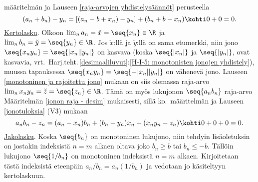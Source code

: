 määritelmän ja Lauseen \ref{raja-arvojen yhdistelysäännöt} perusteella
\[
(a_n+b_n)-y_n = [(a_n-b+x_n)-y_n]+(b_n+b-x_n) \kohti 0+0 = 0.
\]
\underline{Kertolasku}. Olkoon $\lim_na_n=\breve{x}=\seq{x_n}\in\R$ ja
$\lim_nb_n=\breve{y}=\seq{y_n}\in\R$. Jos $\breve{x}$:llä ja $\breve{y}$:llä on sama etumerkki,
niin jono $\seq{x_ny_n}=\seq{|x_n||y_n|}$ on kasvava (koska $\seq{|x_n|}$ ja $\seq{|y_n|}$, ovat
kasvavia, vrt.\ Harj.teht.\,\ref{desimaaliluvut}:\ref{H-I-5: monotonisten jonojen yhdistely}),
muussa tapauksessa $\seq{x_ny_n}=\seq{-|x_n||y_n|}$ on vähenevä jono. Lauseen
\ref{monotoninen ja rajoitettu jono} mukaan on siis olemassa raja-arvo
$\lim_nx_ny_n=\breve{z}=\seq{z_n}\in\R$. Tämä on myös lukujonon $\seq{a_nb_n}$ raja-arvo
Määritelmän \ref{jonon raja - desim} mukaisesti, sillä ko.\ määritelmän ja Lauseen
\ref{jonotuloksia} (V3) mukaan
\[
a_nb_n-z_n = (a_n-x_n)b_n+(b_n-y_n)x_n+(x_ny_n-z_n) \kohti 0+0+0=0.
\]
\underline{Jakolasku}. Koska $\seq{b_n}$ on monotoninen lukujono, niin tehdyin lisäoletuksin
on jostakin indeksistä $n=m$ alkaen oltava joko $b_n \ge b$ tai $b_n \le -b$. Tällöin
lukujono $\seq{1/b_n}$ on monotoninen indeksistä $n=m$ alkaen. Kirjoitetaan tästä indeksistä
eteenpäin $a_n/b_n=a_n(1/b_n)$ ja vedotaan jo käsiteltyyn kertolaskuun. \loppu

